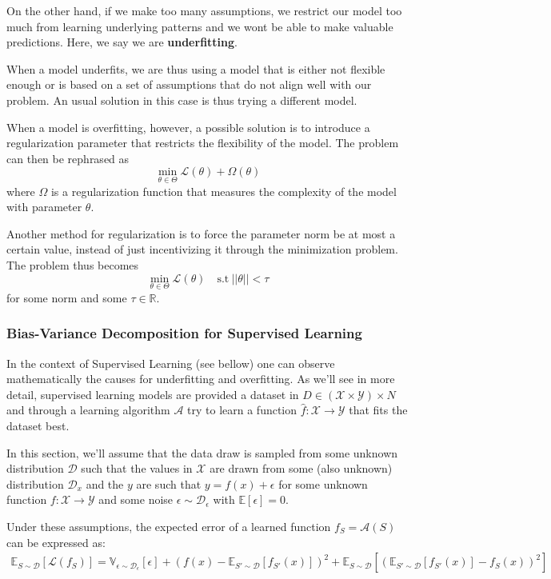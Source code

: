 \documentclass{article}
\newcommand{\R}{\mathbb{R}}
\newcommand{\E}{\mathbb{E}}
\newcommand{\var}{\mathbb{V}}
\newcommand{\loss}{\mathcal{L}}
\newcommand{\dist}{\mathcal{D}}
\begin{document}
On the other hand, if we make too many assumptions, we restrict our model too much from learning underlying patterns and we wont be able to make valuable predictions.
Here, we say we are \textbf{underfitting}.

When a model underfits, we are thus using a model that is either not flexible enough or is based on a set of assumptions that do not align well with our problem.
An usual solution in this case is thus trying a different model.

When a model is overfitting, however, a possible solution is to introduce a regularization parameter that restricts the flexibility of the model.
The problem can then be rephrased as
$$
\min_{\theta \in \Theta} \loss(\theta) + \Omega(\theta)
$$
where $\Omega$ is a regularization function that measures the complexity of the model with parameter $\theta$.

Another method for regularization is to force the parameter norm be at most a certain value, instead of just incentivizing it through the minimization problem.
The problem thus becomes
$$
\min_{\theta \in \Theta} \loss(\theta) \quad \text{s.t} \ ||\theta|| < \tau
$$
for some norm and some $\tau \in \R$.

\subsubsection{Bias-Variance Decomposition for Supervised Learning}

In the context of Supervised Learning (see bellow) one can observe mathematically the causes for underfitting and overfitting.
As we'll see in more detail, supervised learning models are provided a dataset in $D \in (\mathcal{X} \times \mathcal{Y}) \times N$ and through a learning algorithm $\mathcal{A}$ try to learn a function $\hat{f} : \mathcal{X} \to \mathcal{Y}$ that fits the dataset best.

In this section, we'll assume that the data draw is sampled from some unknown distribution $\dist$ such that the values in $\mathcal{X}$ are drawn from some (also unknown) distribution $\dist_x$ and the $y$ are such that $y = f(x) + \epsilon$ for some unknown function $f: \mathcal{X} \to \mathcal{Y}$ and some noise $\epsilon \sim \dist_\epsilon$ with $\E[\epsilon] = 0$.

Under these assumptions, the expected error of a learned function $f_S = \mathcal{A}(S)$ can be expressed as:
\begin{gather*}
\E_{S \sim \dist} \left[ \loss(f_S) \right] = 
\var_{\epsilon \sim \dist_\epsilon} [ \epsilon ] +
    (f(x) - \E_{S' \sim \dist}[f_{S'}(x)])^2 +
    \E_{S \sim \dist} \left[ (\E_{S' \sim \dist} [ f_{S'}(x) ] - f_S(x))^2 \right]
\end{gather*}
\end{document}
